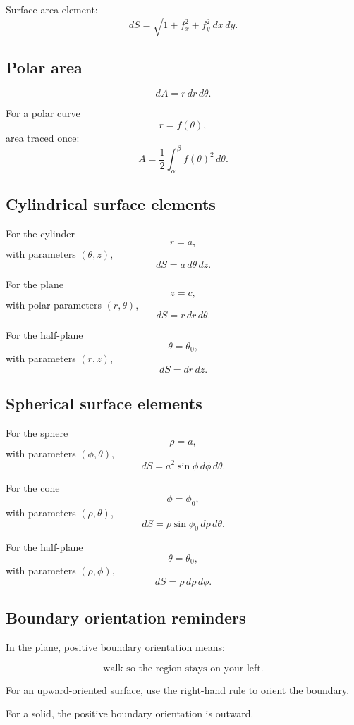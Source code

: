 Surface area element:
\[
\boxed{
    dS=
    \sqrt{1+f_x^2+f_y^2}\,dx\,dy.
}
\]

\subsection*{Polar area}

\[
\boxed{
    dA=r\,dr\,d\theta.
}
\]

For a polar curve
\[
    r=f(\theta),
\]
area traced once:
\[
\boxed{
    A=\frac12\int_\alpha^\beta f(\theta)^2\,d\theta.
}
\]

\subsection*{Cylindrical surface elements}

For the cylinder
\[
    r=a,
\]
with parameters \((\theta,z)\),
\[
\boxed{
    dS=a\,d\theta\,dz.
}
\]

For the plane
\[
    z=c,
\]
with polar parameters \((r,\theta)\),
\[
\boxed{
    dS=r\,dr\,d\theta.
}
\]

For the half-plane
\[
    \theta=\theta_0,
\]
with parameters \((r,z)\),
\[
\boxed{
    dS=dr\,dz.
}
\]

\subsection*{Spherical surface elements}

For the sphere
\[
    \rho=a,
\]
with parameters \((\phi,\theta)\),
\[
\boxed{
    dS=a^2\sin\phi\,d\phi\,d\theta.
}
\]

For the cone
\[
    \phi=\phi_0,
\]
with parameters \((\rho,\theta)\),
\[
\boxed{
    dS=\rho\sin\phi_0\,d\rho\,d\theta.
}
\]

For the half-plane
\[
    \theta=\theta_0,
\]
with parameters \((\rho,\phi)\),
\[
\boxed{
    dS=\rho\,d\rho\,d\phi.
}
\]

\subsection*{Boundary orientation reminders}

In the plane, positive boundary orientation means:

\[
\boxed{
    \text{walk so the region stays on your left.}
}
\]

For an upward-oriented surface, use the right-hand rule to orient the boundary.

For a solid, the positive boundary orientation is outward.

